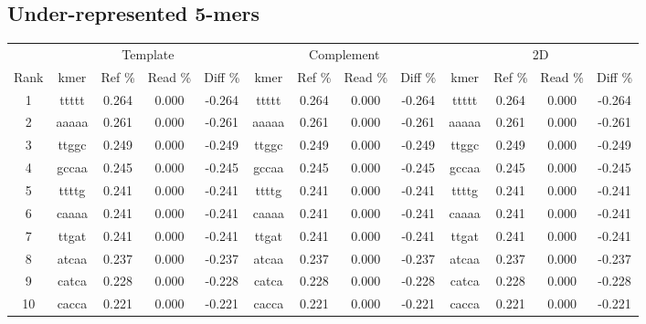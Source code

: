 \documentclass[a4paper,11pt,oneside]{article}
\begin{document}
\subsection*{Under-represented 5-mers}
\vspace{-3mm}
\begin{table}[H]
{\footnotesize
\fontsize{7pt}{9pt}\selectfont
\begin{tabular}{|c|c c c c|c c c c|c c c c|}
\cline{1-13}
 & \multicolumn{4}{c|}{Template} & \multicolumn{4}{c|}{Complement} & \multicolumn{4}{c|}{2D} \\
Rank & kmer & Ref \% & Read \% & Diff \% & kmer & Ref \% & Read \% & Diff \% & kmer & Ref \% & Read \% & Diff \% \\
\cline{1-13}
1 & ttttt & 0.264 & 0.000 & -0.264 & ttttt & 0.264 & 0.000 & -0.264 & ttttt & 0.264 & 0.000 & -0.264 \\
2 & aaaaa & 0.261 & 0.000 & -0.261 & aaaaa & 0.261 & 0.000 & -0.261 & aaaaa & 0.261 & 0.000 & -0.261 \\
3 & ttggc & 0.249 & 0.000 & -0.249 & ttggc & 0.249 & 0.000 & -0.249 & ttggc & 0.249 & 0.000 & -0.249 \\
4 & gccaa & 0.245 & 0.000 & -0.245 & gccaa & 0.245 & 0.000 & -0.245 & gccaa & 0.245 & 0.000 & -0.245 \\
5 & ttttg & 0.241 & 0.000 & -0.241 & ttttg & 0.241 & 0.000 & -0.241 & ttttg & 0.241 & 0.000 & -0.241 \\
6 & caaaa & 0.241 & 0.000 & -0.241 & caaaa & 0.241 & 0.000 & -0.241 & caaaa & 0.241 & 0.000 & -0.241 \\
7 & ttgat & 0.241 & 0.000 & -0.241 & ttgat & 0.241 & 0.000 & -0.241 & ttgat & 0.241 & 0.000 & -0.241 \\
8 & atcaa & 0.237 & 0.000 & -0.237 & atcaa & 0.237 & 0.000 & -0.237 & atcaa & 0.237 & 0.000 & -0.237 \\
9 & catca & 0.228 & 0.000 & -0.228 & catca & 0.228 & 0.000 & -0.228 & catca & 0.228 & 0.000 & -0.228 \\
10 & cacca & 0.221 & 0.000 & -0.221 & cacca & 0.221 & 0.000 & -0.221 & cacca & 0.221 & 0.000 & -0.221 \\
\cline{1-13}
\end{tabular}
}
\end{table}
\vspace{-3mm}
\end{document}
